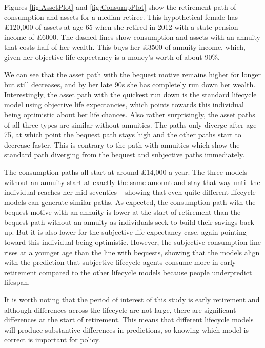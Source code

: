\documentclass[12pt]{article}
\begin{document}
Figures \ref{fig:AssetPlot} and \ref{fig:ConsumpPlot} show the retirement path
of consumption and assets for a median retiree. This hypothetical female has
£120,000 of assets at age 65 when she retired in 2012 with a state pension
income of £6000. The dashed lines show consumption and assets with an annuity
that costs half of her wealth. This buys her £3500 of annuity income, which,
given her objective life expectancy is a money's worth of about 90\%.

We can see that the asset path with the bequest motive remains higher for longer
but still decreases, and by her late 90s she has completely run down her
wealth. Interestingly, the asset path with the quickest run down is the standard
lifecycle model using objective life expectancies, which points towards this
individual being optimistic about her life chances. Also rather surprisingly,
the asset paths of all three types are similar without annuities. The paths only
diverge after age 75, at which point the bequest path stays high and the other
paths start to decrease faster. This is contrary to the path with annuities
which show the standard path diverging from the bequest and subjective paths
immediately.

The consumption paths all start at around £14,000 a year. The three models without an
annuity start at exactly the same amount and stay that way until the individual
reaches her mid seventies -- showing that even quite different lifecycle models
can generate similar paths. As expected, the consumption path with the bequest
motive with an annuity is lower at the start of retirement than the bequest path
without an annuity as individuals seek to build their savings back up. But it is
also lower for the subjective life expectancy case, again pointing toward this
individual being optimistic. However, the subjective consumption line rises at a
younger age than the line with bequests, showing that the models align with the
prediction that subjective lifecycle agents consume more in early retirement
compared to the other lifecycle models because people underpredict lifespan.

It is worth noting that the period of interest of this study is early retirement
and although differences across the lifecycle are not large, there are
significant differences at the start of retirement. This means that different
lifecycle models will produce substantive differences in predictions, so knowing
which model is correct is important for policy.
\end{document}
